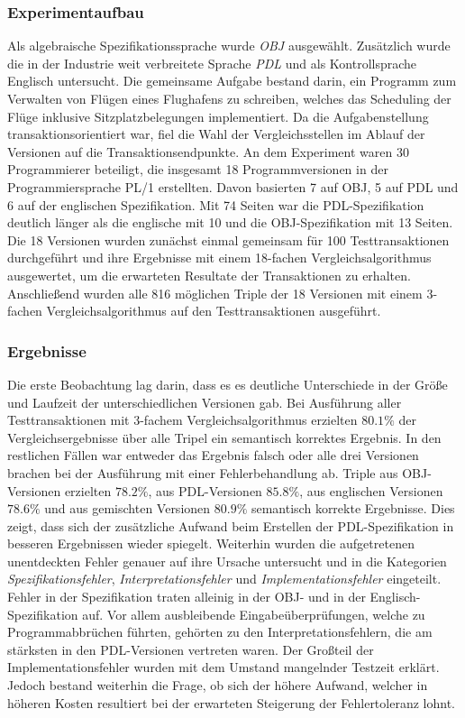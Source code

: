 \subsubsection{Experimentaufbau}\label{ucla-experiment}{
Als algebraische Spezifikationssprache wurde \emph{OBJ} ausgewählt. Zusätzlich wurde die in der Industrie weit verbreitete Sprache \emph{PDL} und als Kontrollsprache Englisch untersucht.
Die gemeinsame Aufgabe bestand darin, ein Programm zum Verwalten von Flügen eines Flughafens zu schreiben, welches das Scheduling der Flüge inklusive Sitzplatzbelegungen implementiert.
Da die Aufgabenstellung transaktionsorientiert war, fiel die Wahl der Vergleichsstellen im Ablauf der Versionen auf die Transaktionsendpunkte.
An dem Experiment waren 30 Programmierer beteiligt, die insgesamt 18 Programmversionen in der Programmiersprache PL/1 erstellten.
Davon basierten 7 auf OBJ, 5 auf PDL und 6 auf der englischen Spezifikation.
Mit 74 Seiten war die PDL-Spezifikation deutlich länger als die englische mit 10 und die OBJ-Spezifikation mit 13 Seiten.
Die 18 Versionen wurden zunächst einmal gemeinsam für 100 Testtransaktionen durchgeführt und ihre Ergebnisse mit einem 18-fachen Vergleichsalgorithmus ausgewertet, um die erwarteten Resultate der Transaktionen zu erhalten.
Anschließend wurden alle 816 möglichen Triple der 18 Versionen mit einem 3-fachen Vergleichsalgorithmus auf den Testtransaktionen ausgeführt.
%
\subsubsection{Ergebnisse}
%
Die erste Beobachtung lag darin, dass es es deutliche Unterschiede in der Größe und Laufzeit der unterschiedlichen Versionen gab.
Bei Ausführung aller Testtransaktionen mit 3-fachem Vergleichsalgorithmus erzielten $80.1\%$ der Vergleichsergebnisse über alle Tripel ein semantisch korrektes Ergebnis.
In den restlichen Fällen war entweder das Ergebnis falsch oder alle drei Versionen brachen bei der Ausführung mit einer Fehlerbehandlung ab.
Triple aus OBJ-Versionen erzielten $78.2\%$, aus PDL-Versionen $85.8\%$, aus englischen Versionen $78.6\%$ und aus gemischten Versionen $80.9\%$ semantisch korrekte Ergebnisse. 
Dies zeigt, dass sich der zusätzliche Aufwand beim Erstellen der PDL-Spezifikation in besseren Ergebnissen wieder spiegelt.
Weiterhin wurden die aufgetretenen unentdeckten Fehler genauer auf ihre Ursache untersucht und in die Kategorien \emph{Spezifikationsfehler}, \emph{Interpretationsfehler} und \emph{Implementationsfehler} eingeteilt.
Fehler in der Spezifikation traten alleinig in der OBJ- und in der Englisch-Spezifikation auf.
Vor allem ausbleibende Eingabeüberprüfungen, welche zu Programmabbrüchen führten, gehörten zu den Interpretationsfehlern, die am stärksten in den PDL-Versionen vertreten waren.
Der Großteil der Implementationsfehler wurden mit dem Umstand mangelnder Testzeit erklärt.
Jedoch bestand weiterhin die Frage, ob sich der höhere Aufwand, welcher in höheren Kosten resultiert bei der erwarteten Steigerung der Fehlertoleranz lohnt.

}
